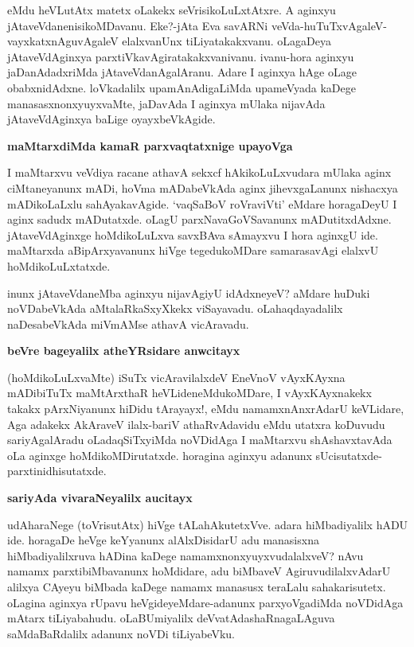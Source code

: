 \noindent
eMdu heVLutAtx matetx oLakekx seVrisikoLuLxtAtxre. A aginxyu 
jAtaveVdanenisi\-koMDa\-vanu. Eke?-jAta Eva \-savARNi 
veVda-huTuTxvAgaleV-vayxkatxnAguvAgaleV elalxvanUnx tiLiyatakakxvanu. oLagaDeya jAta\-veVdA\-ginxya parxtiVkavAgiratakakxvanivanu. ivanu-hora aginxyu jaDanAdadxriMda jAtaveVdanAga\-lAranu. Adare I aginxya hAge oLage obabxnidAdxne. loVkadalilx upamAnAdigaLiMda upameVyada kaDege manasasxnonxyuyx\-vaMte, jaDavAda I aginxya mUlaka nijavAda jAtaveVdAginxya baLige oyayxbeVkA\-gide.

{\bigskip
\noindent
{\large\bf maMtarxdiMda kamaR parxvaqtatxnige upayoVga}}\label{page117}
\medskip

\noindent
I maMtarxvu veVdiya racane athavA sekxcf hAkikoLuLxvudara mUlaka 
aginx ciMtaneyanunx mADi, hoVma mADabeVkAda aginx jihevxgaLanunx nishacxya mADikoLaLxlu sahAyakavAgide. `vaqSaBoV roVra\-viVti' eMdare\- horagaDeyU I aginx sadudx mADutatxde. oLagU parxNavaGoVSavanunx mADutitxdAdxne. jAtaveVdA\-ginxge hoMdikoLuLxva savxBAva sAmayxvu I hora aginxgU ide. maMtarxda aBipArxyavanunx hiVge tegedu\-koMDare samarasavAgi elalxvU hoMdikoLuLxtatxde.

inunx jAtaveVdaneMba aginxyu nijavAgiyU idAdxneyeV? aMdare 
huDuki noVDabeVkAda aMta\-laR\-kaSxyXkekx viSayavadu. oLahaqdayadalilx naDesabeVkAda miVmAMse athavA vicAravadu.

{\bigskip
\noindent
{\large\bf beVre bageyalilx atheYRsidare anwcitayx}}\label{page117}
\medskip

\noindent
(hoMdikoLuLxvaMte) iSuTx vicAravilalxdeV EneVnoV vAyxKAyxna mADibiTuTx 
maMtArxthaR heVLide\-neMdu\-koMDare, I vAyxKAyxnakekx takakx pArxNiyanunx 
hiDidu tArayayx!, eMdu namamxnAnxrAdarU keVLidare, Aga adakekx 
AkA\-raveV ilalx-bariV athaRvAdavidu eMdu utatxra koDuvudu 
sariyAgalAradu oLadaqSiTx\-yiMda noVDi\-dAga I maMtarxvu shAshavxtavAda oLa aginxge hoMdikoMDirutatxde. horagina aginxyu adanunx sUcisu\-tatxde-parxtinidhisutatxde.

{\bigskip
\noindent
{\large\bf sariyAda vivaraNeyalilx aucitayx}}\label{page117}
\medskip

\noindent
udAharaNege (toVrisutAtx) hiVge tALahAkutetxVve. adara hiMbadiyalilx 
hADU ide. horagaDe heVge keYyanunx alAlxDisidarU adu manasisxna 
hiMbadiyalilxruva \hbox{hADina} kaDege namamxnonxyuyxvudalalxveV? nAvu namamx 
parxtibiMbavanunx hoMdidare, adu biMbaveV AgiruvudilalxvAdarU alilxya CAyeyu biMbada kaDege namamx manasusx teraLalu sahakarisutetx. oLagina aginxya rUpavu heVgideyeMdare-adanunx parxyoVga\-diMda noVDidAga mAtarx tiLiyabahudu. oLaBUmiyalilx deVvatAdashaRna\-gaLA\-guva saMdaBaRdalilx adanunx noVDi tiLiyabeVku.

